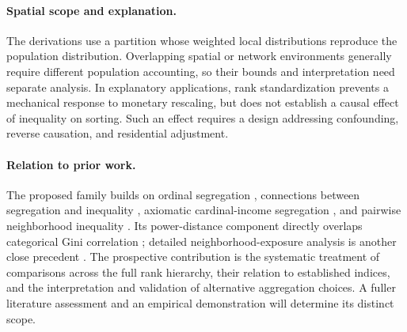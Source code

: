 \documentclass[11pt]{article}
\begin{document}
\paragraph{Spatial scope and explanation.}
The derivations use a partition whose weighted local distributions reproduce the population distribution. Overlapping spatial or network environments generally require different population accounting, so their bounds and interpretation need separate analysis. In explanatory applications, rank standardization prevents a mechanical response to monetary rescaling, but does not establish a causal effect of inequality on sorting. Such an effect requires a design addressing confounding, reverse causation, and residential adjustment.

\paragraph{Relation to prior work.}
The proposed family builds on ordinal segregation \citep{meng2006}, connections between segregation and inequality \citep{jargowsky2009}, axiomatic cardinal-income segregation \citep{lasso2020}, and pairwise neighborhood inequality \citep{andreoli2021,turk2023}. Its power-distance component directly overlaps categorical Gini correlation \citep{dang2021,rizzo2010}; detailed neighborhood-exposure analysis is another close precedent \citep{reardonfox2015}. The prospective contribution is the systematic treatment of comparisons across the full rank hierarchy, their relation to established indices, and the interpretation and validation of alternative aggregation choices. A fuller literature assessment and an empirical demonstration will determine its distinct scope.
\end{document}
